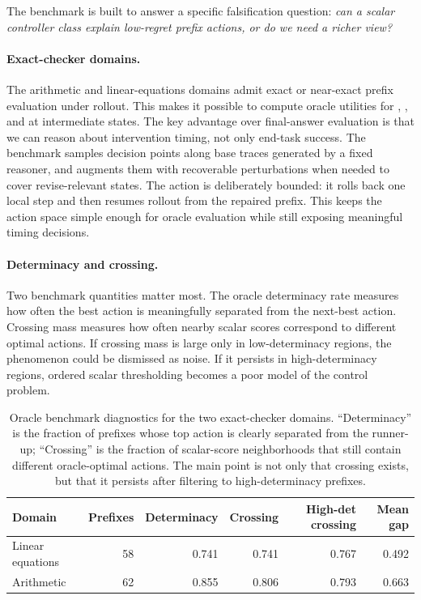 The benchmark is built to answer a specific falsification question:
\emph{can a scalar controller class explain low-regret prefix actions, or do we need a richer \processstate view?}

\paragraph{Exact-checker domains.}
The arithmetic and linear-equations domains admit exact or near-exact prefix evaluation under rollout.
This makes it possible to compute oracle utilities for \continue, \revise, and \abstain at intermediate states.
The key advantage over final-answer evaluation is that we can reason about intervention timing, not only end-task success.
The benchmark samples decision points along base traces generated by a fixed reasoner, and augments them with recoverable perturbations when needed to cover revise-relevant states.
The \revise action is deliberately bounded: it rolls back one local step and then resumes rollout from the repaired prefix.
This keeps the action space simple enough for oracle evaluation while still exposing meaningful timing decisions.

\paragraph{Determinacy and crossing.}
Two benchmark quantities matter most.
The oracle determinacy rate measures how often the best action is meaningfully separated from the next-best action.
Crossing mass measures how often nearby scalar scores correspond to different optimal actions.
If crossing mass is large only in low-determinacy regions, the phenomenon could be dismissed as noise.
If it persists in high-determinacy regions, ordered scalar thresholding becomes a poor model of the control problem.

\begin{table}[t]
\centering
\caption{Oracle benchmark diagnostics for the two exact-checker domains. ``Determinacy'' is the fraction of prefixes whose top action is clearly separated from the runner-up; ``Crossing'' is the fraction of scalar-score neighborhoods that still contain different oracle-optimal actions. The main point is not only that crossing exists, but that it persists after filtering to high-determinacy prefixes.}
\label{tab:benchmark}
\begin{tabular}{lrrrrr}
\toprule
Domain & Prefixes & Determinacy & Crossing & High-det crossing & Mean gap \\
\midrule
Linear equations & 58 & 0.741 & 0.741 & 0.767 & 0.492 \\
Arithmetic & 62 & 0.855 & 0.806 & 0.793 & 0.663 \\
\bottomrule
\end{tabular}
\end{table}

